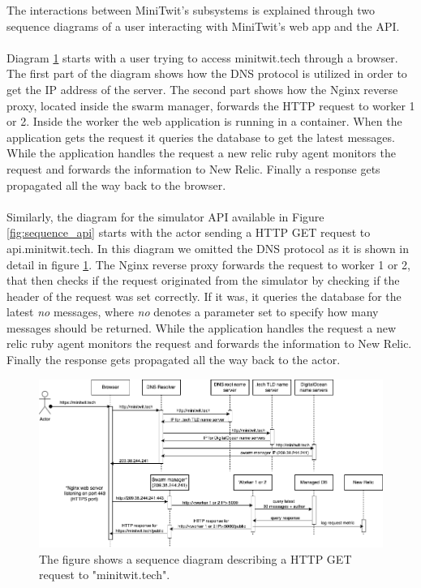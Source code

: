 \documentclass{article}
\begin{document}
The interactions between MiniTwit's subsystems is explained through two sequence diagrams of a user interacting with MiniTwit's web app and the API. 
\\\\
Diagram \ref{fig:sequence} starts with a user trying to access minitwit.tech through a browser. The first part of the diagram shows how the DNS protocol is utilized in order to get the IP address of the server. The second part shows how the Nginx reverse proxy, located inside the swarm manager, forwards the HTTP request to worker 1 or 2. Inside the worker the web application is running in a container. When the application gets the request it queries the database to get the latest messages. While the application handles the request a new relic ruby agent monitors the request and forwards the information to New Relic. Finally a response gets propagated all the way back to the browser.
\\\\
Similarly, the diagram for the simulator API available in Figure \ref{fig:sequence_api} starts with the actor sending a HTTP GET request to api.minitwit.tech. In this diagram we omitted the DNS protocol as it is shown in detail in figure \ref{fig:sequence}. The Nginx reverse proxy forwards the request to worker 1 or 2, that then checks if the request originated from the simulator by checking if the header of the request was set correctly. If it was, it queries the database for the latest \textit{no} messages, where \textit{no} denotes a parameter set to specify how many messages should be returned. While the application handles the request a new relic ruby agent monitors the request and forwards the information to New Relic. Finally the response gets propagated all the way back to the actor.

\begin{figure}[H]
    \centering
    \includegraphics[width=\textwidth]{images/devops-sequence.png}
    \caption{The figure shows a sequence diagram describing a HTTP GET request to "minitwit.tech". }
    \label{fig:sequence}
\end{figure}
\end{document}
